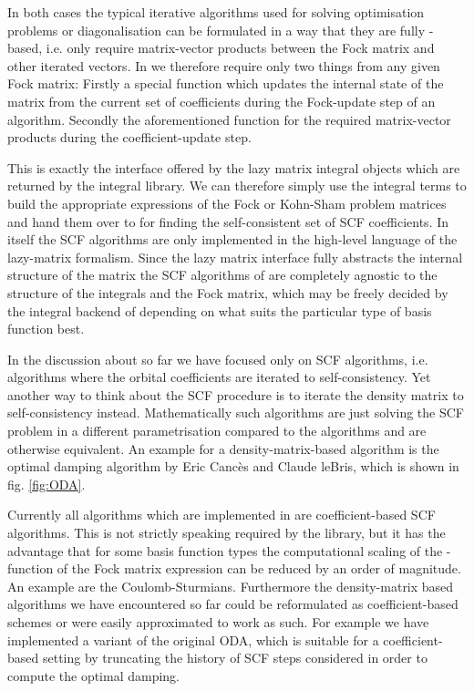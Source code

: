 In both cases the typical iterative algorithms used for
solving optimisation problems or diagonalisation
can be formulated in a way that they are fully \contraction-based,
i.e. only require matrix-vector products between the Fock matrix
and other iterated vectors.
In \gscf we therefore require only two things from any given Fock matrix:
Firstly a special \update function which updates the internal state of
the matrix from the current set of coefficients
during the Fock-update step of an algorithm.
Secondly the aforementioned \contraction function for the
required matrix-vector products
during the coefficient-update step.

This is exactly the interface offered by the lazy matrix integral objects
which are returned by the \gint integral library.
We can therefore simply use the \gint integral terms to build the appropriate expressions
of the Fock or Kohn-Sham problem matrices
and hand them over to \gscf for finding the self-consistent set of SCF coefficients.
In \gscf itself the SCF algorithms are only implemented in the
high-level language of the lazy-matrix formalism.
Since the lazy matrix interface fully abstracts the internal structure of the matrix
the SCF algorithms of \gscf
are completely agnostic to the structure of the integrals and the Fock matrix,
which may be freely decided by the integral backend of \gint
depending on what suits the particular type of basis function best.

In the discussion about \gscf so far we have focused only on
 SCF algorithms,
i.e. algorithms where the orbital coefficients are iterated to self-consistency.
Yet another way to think about the SCF procedure is to iterate the
density matrix to self-consistency instead.
Mathematically such  algorithms
are just solving the SCF problem in a different parametrisation
compared to the  algorithms
and are otherwise equivalent.
An example for a density-matrix-based algorithm is the optimal damping algorithm
by Eric Cancès and Claude leBris,
which is shown in fig. \ref{fig:ODA}.

Currently all algorithms which are implemented in \gscf are coefficient-based SCF algorithms.
This is not strictly speaking required by the library,
but it has the advantage that for some basis function types
the computational scaling of the \contraction-function
of the Fock matrix expression can be reduced by an order of magnitude.
An example are the Coulomb-Sturmians.
Furthermore the density-matrix based algorithms
we have encountered so far could be reformulated as coefficient-based schemes
or were easily approximated to work as such.
For example we have implemented a variant of the original ODA,
which is suitable for a coefficient-based setting by truncating
the history of SCF steps considered in order to compute the optimal damping.


